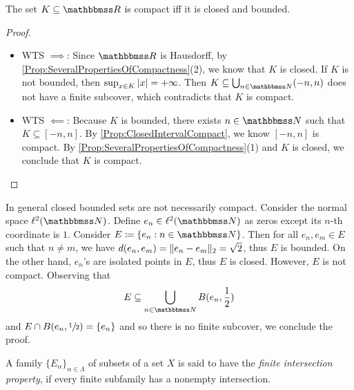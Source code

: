 \documentclass[screen,single]{techreport}
\numberwithin{equation}{section}
\begin{document}
\begin{theorem}\label{The:HeineBorelProperty}
	The set $K \subseteq \bbR$ is compact iff it is closed and bounded.
\end{theorem}
\begin{proof}\
	\begin{itemize}
		\item WTS ${\implies}$: Since $\bbR$ is Hausdorff, by \cref{Prop:SeveralPropertiesOfCompactness}(2), we know that $K$ is closed.
		If $K$ is not bounded, then $\sup_{x \in K} |{x}| = +\infty$.
		Then $K \subseteq \bigcup_{n \in \bbN} (-n,n)$ does not have a finite subcover, which contradicts that $K$ is compact.
		
		\item WTS ${\impliedby}$: Because $K$ is bounded, there exists $n \in \bbN$ such that $K \subseteq [-n,n]$.
		By \cref{Prop:ClosedIntervalCompact}, we know $[-n,n]$ is compact.
		By \cref{Prop:SeveralPropertiesOfCompactness}(1) and $K$ is closed, we conclude that $K$ is compact.
	\end{itemize}
\end{proof}

\begin{example}\label{Exa:ClosedBoundedNotCompact}
	In general closed bounded sets are not necessarily compact.
	Consider the normal space $\ell^2(\bbN)$.
	Define $e_n \in \ell^2(\bbN)$ as zeros except its $n$-th coordinate is $1$.
	Consider $E \coloneqq \set{e_n : n \in \bbN}$.
	Then for all $e_n,e_m \in E$ such that $n\ne m$, we have $d(e_n,e_m) = \|{e_n - e_m}\|_2 = \sqrt{2}$, thus $E$ is bounded.
	On the other hand, $e_n$'s are isolated points in $E$, thus $E$ is closed.
	However, $E$ is not compact.
	Observing that
	\[
	E \subseteq \bigcup_{n \in \bbN} B\p{e_n, \frac{1}{2}}
	\]
	and $E \cap B(e_n,\sfrac{1}{2}) = \{ e_n \}$ and so there is no finite subcover,
	we conclude the proof.
\end{example}

\begin{definition}\label{De:FiniteIntersectionProperty}
	A family $\{E_\alpha\}_{\alpha \in \Lambda}$ of subsets of a set $X$ is said to have the \emph{finite intersection property}, if every finite subfamily has a nonempty intersection.
\end{definition}
\end{document}
